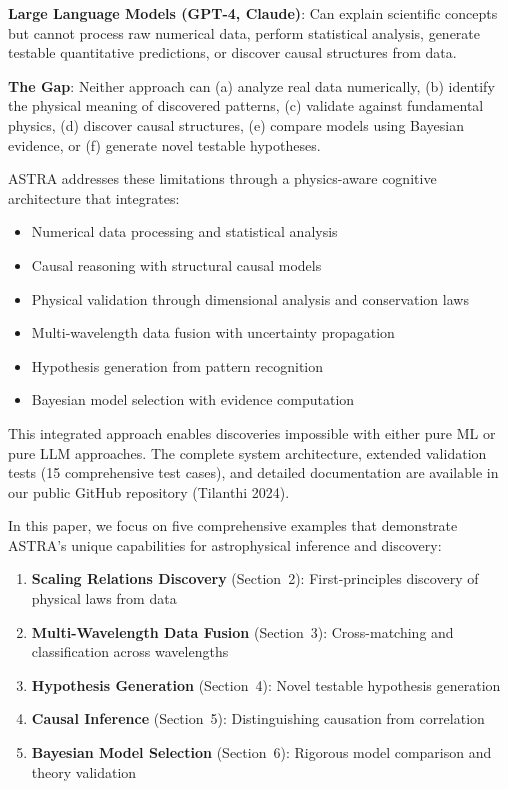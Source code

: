\documentclass[usenatbib]{rasti}
\begin{document}
\textbf{Large Language Models (GPT-4, Claude)}: Can explain scientific concepts but cannot process raw numerical data, perform statistical analysis, generate testable quantitative predictions, or discover causal structures from data.

\textbf{The Gap}: Neither approach can (a) analyze real data numerically, (b) identify the physical meaning of discovered patterns, (c) validate against fundamental physics, (d) discover causal structures, (e) compare models using Bayesian evidence, or (f) generate novel testable hypotheses.

ASTRA addresses these limitations through a physics-aware cognitive architecture that integrates:
\begin{itemize}
\item Numerical data processing and statistical analysis
\item Causal reasoning with structural causal models
\item Physical validation through dimensional analysis and conservation laws
\item Multi-wavelength data fusion with uncertainty propagation
\item Hypothesis generation from pattern recognition
\item Bayesian model selection with evidence computation
\end{itemize}

This integrated approach enables discoveries impossible with either pure ML or pure LLM approaches. The complete system architecture, extended validation tests (15 comprehensive test cases), and detailed documentation are available in our public GitHub repository (Tilanthi 2024)\cite{astra_github}.

In this paper, we focus on five comprehensive examples that demonstrate ASTRA's unique capabilities for astrophysical inference and discovery:
\begin{enumerate}
\item \textbf{Scaling Relations Discovery} (Section~2): First-principles discovery of physical laws from data
\item \textbf{Multi-Wavelength Data Fusion} (Section~3): Cross-matching and classification across wavelengths
\item \textbf{Hypothesis Generation} (Section~4): Novel testable hypothesis generation
\item \textbf{Causal Inference} (Section~5): Distinguishing causation from correlation
\item \textbf{Bayesian Model Selection} (Section~6): Rigorous model comparison and theory validation
\end{enumerate}
\end{document}
